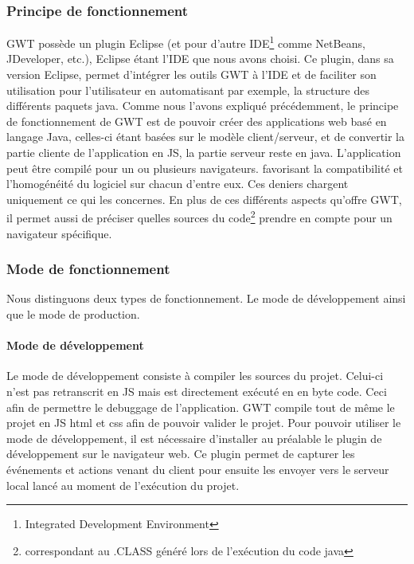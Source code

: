 \subsubsection{Principe de fonctionnement}
GWT possède un plugin Eclipse (et pour d'autre IDE\footnote{Integrated Development Environment} comme NetBeans, JDeveloper, etc.), Eclipse étant l'IDE que nous avons choisi. Ce plugin, dans sa version Eclipse, permet d'intégrer les outils GWT à l'IDE et de faciliter son utilisation pour l'utilisateur en automatisant par exemple, la structure des différents paquets java.
\newline
\indent
Comme nous l'avons expliqué précédemment, le principe de fonctionnement de GWT est de pouvoir créer des applications web basé en langage Java, celles-ci étant basées sur le modèle client/serveur, et de convertir la partie cliente de l'application en JS, la partie serveur reste en java. L'application peut être compilé pour un ou plusieurs navigateurs. favorisant la compatibilité et l'homogénéité du logiciel sur chacun d'entre eux. Ces deniers chargent uniquement ce qui les concernes. En plus de ces différents aspects qu'offre GWT, il permet aussi de préciser quelles sources du code\footnote{correspondant au .CLASS généré lors de l'exécution du code java} prendre en compte pour un navigateur spécifique.

\subsubsection{Mode de fonctionnement}
Nous distinguons deux types de fonctionnement. Le mode de développement ainsi que le mode de production.
	
\paragraph{Mode de développement}
Le mode de développement consiste à compiler les sources du projet. Celui-ci n'est pas retranscrit en JS mais est directement exécuté en en byte code. Ceci afin de permettre le debuggage de l'application. GWT compile tout de même le projet en JS html et css afin de pouvoir valider le projet.
Pour pouvoir utiliser le mode de développement, il est nécessaire d'installer au préalable le plugin de développement sur le navigateur web. Ce plugin permet de capturer les événements et actions venant du client pour ensuite les envoyer vers le serveur local lancé au moment de l'exécution du projet.
